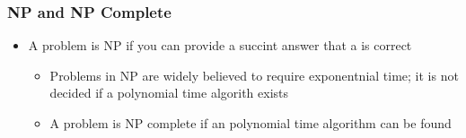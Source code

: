     \subsubsection{NP and NP Complete}

      \begin{itemize}
        \item A problem is NP if you can provide a succint answer that a
         is correct
        \begin{itemize}
          \item Problems in NP are widely believed to require exponentnial
          time; it is not decided if a polynomial time algorith exists
          \item A problem is NP complete if an polynomial time algorithm
          can be found
        \end{itemize}
      \end{itemize}